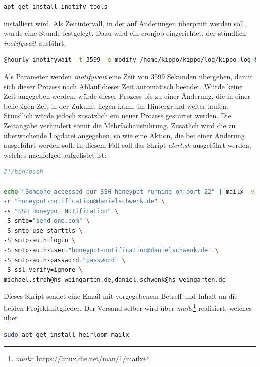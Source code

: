 \begin{lstlisting}[language=bash,style=customccolor]
apt-get install inotify-tools 
\end{lstlisting}

installiert wird. Als Zeitintervall, in der auf Änderungen überprüft werden soll, wurde eine Stunde festgelegt. Dazu wird ein cronjob eingerichtet, der stündlich \textit{inotifywait} ausführt.

\begin{lstlisting}[language=bash,style=customccolor]
@hourly inotifywait -t 3599 -e modify /home/kippo/kippo/log/kippo.log && /home/dschwenk/email-alert/alert.sh
\end{lstlisting}

Als Parameter werden \textit{inotifywait} eine Zeit von 3599 Sekunden übergeben, damit sich dieser Prozess nach Ablauf dieser Zeit automatisch beendet. Würde keine Zeit angegeben werden, würde dieser Prozess bis zu einer Änderung, die in einer beliebigen Zeit in der Zukunft liegen kann, im Hintergrund weiter laufen. Stündlich würde jedoch zusätzlich ein neuer Prozess gestartet werden. Die Zeitangabe verhindert somit die Mehrfachausführung. Zusätlich wird die zu überwachende Logdatei angegeben, so wie eine Aktion, die bei einer Änderung ausgeführt werden soll. In diesem Fall soll das Skript \textit{alert.sh} ausgeführt werden, welches nachfolged aufgelistet ist:

\begin{lstlisting}[language=bash,style=customccolor]
#!/bin/bash

echo "Someone accessed our SSH honeypot running on port 22" | mailx -v \
-r "honeypot-notification@danielschwenk.de" \
-s "SSH Honeypot Notification" \
-S smtp="send.one.com" \
-S smtp-use-starttls \
-S smtp-auth=login \
-S smtp-auth-user="honeypot-notification@danielschwenk.de" \
-S smtp-auth-password="password" \
-S ssl-verify=ignore \
michael.stroh@hs-weingarten.de,daniel.schwenk@hs-weingarten.de
\end{lstlisting}

Dieses Skript sendet eine Email mit vorgegebenem Betreff und Inhalt an die beiden Projektmitglieder. Der Versand selber wird über \textit{mailx}\footnote{ \textit{mailx}: \url{https://linux.die.net/man/1/mailx}} realisiert, welches über

\begin{lstlisting}[language=bash,style=customccolor]
sudo apt-get install heirloom-mailx
\end{lstlisting}

